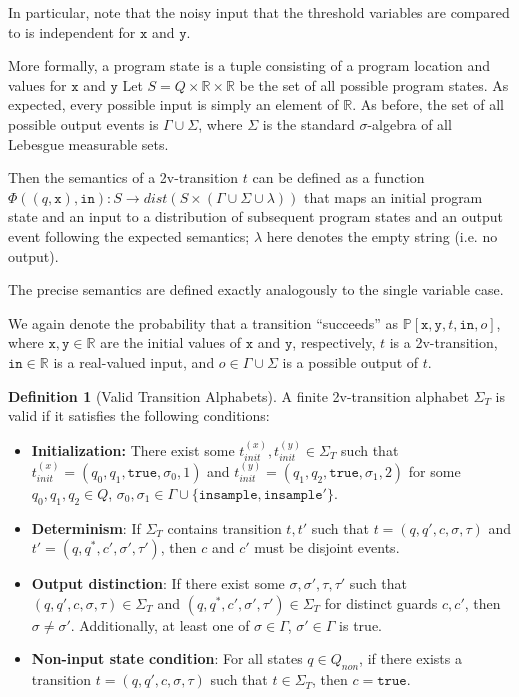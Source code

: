 \documentclass[12pt]{article}
\newcommand{\RR}{\mathbb{R}}
\newcommand{\PP}{\mathbb{P}}
\theoremstyle{definition}
\newtheorem{defn}[thm]{Definition}
\begin{document}
In particular, note that the noisy input that the threshold variables are compared to is independent for $\texttt{x}$ and $\texttt{y}$.

More formally, a program state is a tuple consisting of a program location and values for $\texttt{x}$ and $\texttt{y}$ Let $S = Q\times\RR\times \RR$ be the set of all possible program states. As expected, every possible input is simply an element of $\RR$. 
As before, the set of all possible output events is $\Gamma \cup \Sigma$, where $\Sigma$ is the standard $\sigma$-algebra of all Lebesgue measurable sets. 

Then the semantics of a 2v-transition $t$ can be defined as a function $\Phi((q, \texttt{x}), \texttt{in}): S\to dist(S\times (\Gamma\cup\Sigma\cup \lambda))$ that maps an initial program state and an input to a distribution of subsequent program states and an output event following the expected semantics; $\lambda$ here denotes the empty string (i.e. no output). 

The precise semantics are defined exactly analogously to the single variable case. 

We again denote the probability that a transition ``succeeds'' as $\PP[\texttt{x}, \texttt{y}, t, \texttt{in}, o]$, where $\texttt{x}, \texttt{y}\in \RR$ are the initial values of $\texttt{x}$ and $\texttt{y}$, respectively, $t$ is a 2v-transition, $\texttt{in}\in \RR$ is a real-valued input, and $o\in \Gamma\cup\Sigma$ is a possible output of $t$.

\begin{defn}[Valid Transition Alphabets]
    A finite 2v-transition alphabet $\Sigma_T$ is valid if it satisfies the following conditions: 
    \begin{itemize}
        \item \textbf{Initialization:} There exist some $t_{init}^{(x)}, t_{init}^{(y)}\in \Sigma_T$ such that $t_{init}^{(x)} = (q_0, q_1, \texttt{true}, \sigma_0, 1)$ and $t_{init}^{(y)} = (q_1, q_2, \texttt{true}, \sigma_1, 2)$ for some $q_0, q_1, q_2\in Q$, $\sigma_0, \sigma_1 \in \Gamma\cup\{\texttt{insample}, \texttt{insample}'\}$. 
        \item \textbf{Determinism}: If $\Sigma_T$ contains transition $t, t'$ such that $t=(q, q', c, \sigma, \tau)$ and $t'= (q, q^*, c', \sigma', \tau')$, then $c$ and $c'$ must be disjoint events. 
        \item \textbf{Output distinction}: If there exist some $\sigma, \sigma', \tau, \tau'$ such that $(q, q', c, \sigma, \tau)\in \Sigma_T$  and $(q, q^*, c', \sigma', \tau') \in \Sigma_T$ for distinct guards $c, c'$, then $\sigma \neq \sigma'$. Additionally, at least one of $\sigma\in \Gamma$, $\sigma'\in \Gamma$ is true.
        \item \textbf{Non-input state condition}: For all states $q\in Q_{non}$, if there exists a transition $t=(q, q', c, \sigma, \tau)$ such that $t\in \Sigma_T$, then $c = \texttt{true}$.
    \end{itemize}
\end{defn}
\end{document}
